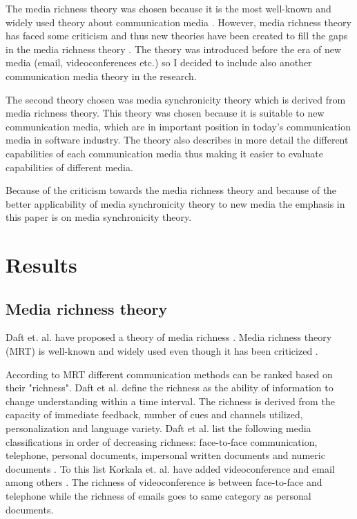 \documentclass[conference]{IEEEtran}
\begin{document}
The media richness theory was chosen because it is the most well-known and widely used theory about communication media \cite{1986daft}\cite{2006korkala}. However, media richness theory has faced some criticism and thus new theories have been created to fill the gaps in the media richness theory \cite{1999dennis}. The theory was introduced before the era of new media (email, videoconferences etc.) so I decided to include also another communication media theory in the research.

The second theory chosen was media synchronicity theory which is derived from media richness theory. This theory was chosen because it is suitable to new communication media, which are in important position in today's communication media in software industry. The theory also describes in more detail the different capabilities of each communication media thus making it easier to evaluate capabilities of different media.

Because of the criticism towards the media richness theory and because of the better applicability of media synchronicity theory to new media the emphasis in this paper is on media synchronicity theory.

\section{Results}

\subsection{Media richness theory}

Daft et. al. have proposed a theory of media richness \cite{1986daft}. Media richness theory (MRT) is well-known and widely used even though it has been criticized \cite{2006korkala} \cite{1999dennis}. 

According to MRT different communication methods can be ranked based on their "richness". Daft et al. define the richness as the ability of information to change understanding within a time interval. The richness is derived from the capacity of immediate feedback, number of cues and channels utilized, personalization and language variety. Daft et al. list the following media classifications in order of decreasing richness: face-to-face communication, telephone, personal documents, impersonal written documents and numeric documents \cite{1986daft}. To this list Korkala et. al. have added videoconference and email among others \cite{2006korkala}. The richness of videoconference is between face-to-face and telephone while the richness of emails goes to same category as personal documents.
\end{document}

